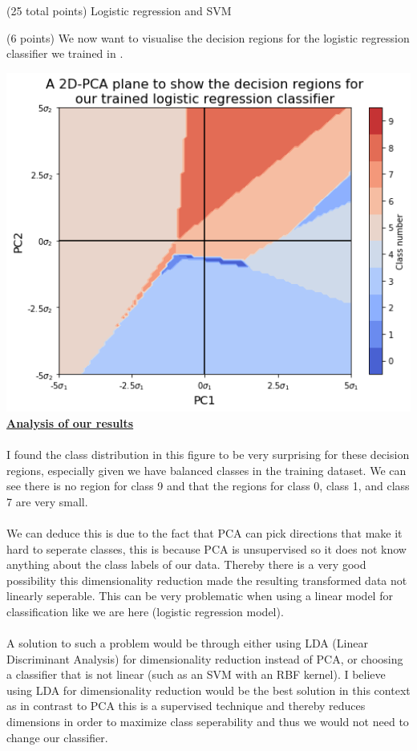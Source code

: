 \documentclass[12pt]{article}
\begin{document}
\begin{question}{(25 total points) Logistic regression and SVM}
\begin{subquestion}{(6 points)
       We now want to visualise the decision regions for the logistic
       regression classifier we trained in .
     }
   

      \begin{answerbox}{45.5em}
         \includegraphics[width=1\textwidth]{images/q23.png}
        \textbf{\footnotesize{\underline{Analysis of our results}}}\\
\\
        \scriptsize{
        I found the class distribution in this figure to be very surprising for these decision regions, especially given we have balanced classes in the training dataset. We can see there is no region for class 9 and that the regions for class 0, class 1, and class 7 are very small.\\
\\
        We can deduce this is due to the fact that PCA can pick directions that make it hard to seperate classes, this is because PCA is unsupervised so it does not know anything about the class labels of our data. Thereby there is a very good possibility this dimensionality reduction made the resulting transformed data not linearly seperable. This can be very problematic when using a linear model for classification like we are here (logistic regression model).\\
\\
        A solution to such a problem would be through either using LDA (Linear Discriminant Analysis) for dimensionality reduction instead of PCA, or choosing a classifier that is not linear (such as an SVM with an RBF kernel). I believe using LDA for dimensionality reduction would be the best solution in this context as in contrast to PCA this is a supervised technique and thereby reduces dimensions in order to maximize class seperability and thus we would not need to change our classifier. 
        }
      \end{answerbox}
  



\end{subquestion}
\end{question}
\end{document}
